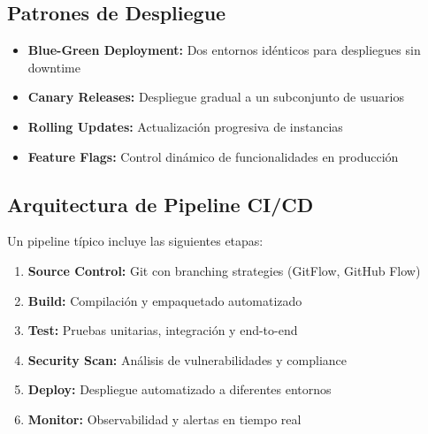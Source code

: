 \documentclass[12pt,a4paper]{article}
\begin{document}
\subsection{Patrones de Despliegue}
\begin{itemize}
    \item \textbf{Blue-Green Deployment:} Dos entornos idénticos para despliegues sin downtime
    \item \textbf{Canary Releases:} Despliegue gradual a un subconjunto de usuarios
    \item \textbf{Rolling Updates:} Actualización progresiva de instancias
    \item \textbf{Feature Flags:} Control dinámico de funcionalidades en producción
\end{itemize}

\subsection{Arquitectura de Pipeline CI/CD}
Un pipeline típico incluye las siguientes etapas:
\begin{enumerate}
    \item \textbf{Source Control:} Git con branching strategies (GitFlow, GitHub Flow)
    \item \textbf{Build:} Compilación y empaquetado automatizado
    \item \textbf{Test:} Pruebas unitarias, integración y end-to-end
    \item \textbf{Security Scan:} Análisis de vulnerabilidades y compliance
    \item \textbf{Deploy:} Despliegue automatizado a diferentes entornos
    \item \textbf{Monitor:} Observabilidad y alertas en tiempo real
\end{enumerate}

\newpage
\end{document}
